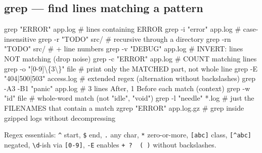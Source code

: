 \documentclass[11pt]{article}
\newenvironment{Shaded}{\begin{snugshade}}{\end{snugshade}}
\newcommand{\AttributeTok}[1]{\textcolor[rgb]{0.16,0.50,0.73}{#1}}
\newcommand{\CommentTok}[1]{\textcolor[rgb]{0.48,0.49,0.49}{#1}}
\newcommand{\FunctionTok}[1]{\textcolor[rgb]{0.56,0.27,0.68}{#1}}
\newcommand{\NormalTok}[1]{\textcolor[rgb]{0.81,0.81,0.76}{#1}}
\newcommand{\PreprocessorTok}[1]{\textcolor[rgb]{0.15,0.68,0.38}{#1}}
\newcommand{\StringTok}[1]{\textcolor[rgb]{0.96,0.31,0.31}{#1}}
\begin{document}
\subsection{grep --- find lines matching a pattern}\label{grep--find-lines-matching-a-pattern}


\begin{Shaded}
\begin{Highlighting}[]
\FunctionTok{grep} \StringTok{"ERROR"}\NormalTok{ app.log              }\CommentTok{\# lines containing ERROR}
\FunctionTok{grep} \AttributeTok{{-}i} \StringTok{"error"}\NormalTok{ app.log           }\CommentTok{\# case{-}insensitive}
\FunctionTok{grep} \AttributeTok{{-}r} \StringTok{"TODO"}\NormalTok{ src/               }\CommentTok{\# recursive through a directory}
\FunctionTok{grep} \AttributeTok{{-}rn} \StringTok{"TODO"}\NormalTok{ src/              }\CommentTok{\# + line numbers}
\FunctionTok{grep} \AttributeTok{{-}v} \StringTok{"DEBUG"}\NormalTok{ app.log           }\CommentTok{\# INVERT: lines NOT matching (drop noise)}
\FunctionTok{grep} \AttributeTok{{-}c} \StringTok{"ERROR"}\NormalTok{ app.log           }\CommentTok{\# COUNT matching lines}
\FunctionTok{grep} \AttributeTok{{-}o} \StringTok{"[0{-}9]\textbackslash{}\{3\textbackslash{}\}"}\NormalTok{ file         }\CommentTok{\# print only the MATCHED part, not whole line}
\FunctionTok{grep} \AttributeTok{{-}E} \StringTok{"404|500|503"}\NormalTok{ access.log  }\CommentTok{\# extended regex (alternation without backslashes)}
\FunctionTok{grep} \AttributeTok{{-}A3} \AttributeTok{{-}B1} \StringTok{"panic"}\NormalTok{ app.log      }\CommentTok{\# 3 lines After, 1 Before each match (context)}
\FunctionTok{grep} \AttributeTok{{-}w} \StringTok{"id"}\NormalTok{ file                 }\CommentTok{\# whole{-}word match (not "idle", "void")}
\FunctionTok{grep} \AttributeTok{{-}l} \StringTok{"needle"} \PreprocessorTok{*}\NormalTok{.log            }\CommentTok{\# just the FILENAMES that contain a match}
\FunctionTok{zgrep} \StringTok{"ERROR"}\NormalTok{ app.log.gz          }\CommentTok{\# grep inside gzipped logs without decompressing}
\end{Highlighting}
\end{Shaded}

Regex essentials: \texttt{\^{}} start, \texttt{\$} end, \texttt{.} any char, \texttt{*} zero-or-more, \texttt{{[}abc{]}} class, \texttt{{[}\^{}abc{]}} negated, \texttt{\textbackslash{}d}-ish via \texttt{{[}0-9{]}}, \texttt{-E} enables \texttt{+\ ?\ \textbar{}\ (\ )} without backslashes.
\end{document}
